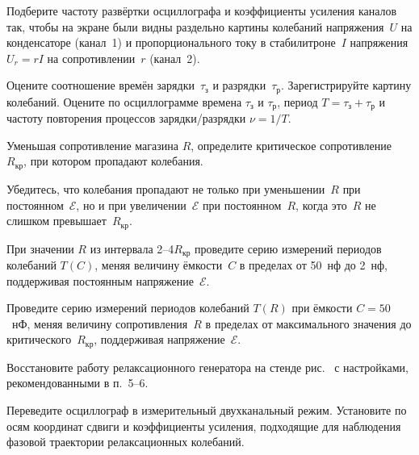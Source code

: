 \begin{lab:task}
		\item Подберите частоту развёртки осциллографа и коэффициенты 
        усиления каналов так, чтобы на экране были видны раздельно картины
        колебаний напряжения~$U$ на конденсаторе (канал~1) и пропорционального
        току в стабилитроне~$I$ напряжения $U_r=rI$ на сопротивлении~$r$
        (канал~2).

		\item Оцените соотношение времён зарядки~$\tau_{\text{з}}$ 
        и разрядки~$\tau_{\text{р}}$. Зарегистрируйте картину колебаний.
        Оцените по осциллограмме времена $\tau_{з}$ и $\tau_{р}$, 
        период $T=\tau_{з}+\tau_{р}$ и частоту повторения
        процессов зарядки/разрядки $\nu = 1/T$.

		\item Уменьшая сопротивление магазина $R$, определите критическое 
        сопротивление~$R_{\text{кр}}$, при котором пропадают колебания.

        \item Убедитесь, что колебания пропадают не только 
        при уменьшении~$R$ при постоянном~$\mathcal{E}$, 
        но и при увеличении~$\mathcal{E}$ при постоянном~$R$, 
        когда это~$R$ не слишком превышает~$R_{\text{кр}}$.
        
        \item При значении $R$ из интервала 2--4$R_{кр}$ проведите серию 
        измерений периодов колебаний $T(C)$, меняя величину
        ёмкости~$C$ в пределах от 50~нф до 2~нф, поддерживая постоянным
        напряжение~$\mathcal{E}$.
        
        \item Проведите серию измерений периодов колебаний $T(R)$ при
        ёмкости $C=50$~нФ, меняя величину сопротивления~$R$ в пределах
        от максимального значения до критического~$R_{кр}$,
        поддерживая напряжение~$\mathcal{E}$.


		\item Восстановите работу релаксационного генератора 
        на стенде рис.~ с настройками, рекомендованными 
        в п.~5--6. 
        
        \item Переведите осциллограф в измерительный двухканальный режим.
        Установите по осям координат сдвиги и коэффициенты усиления,
        подходящие для наблюдения фазовой траектории релаксационных
        колебаний.
        

\end{lab:task}
